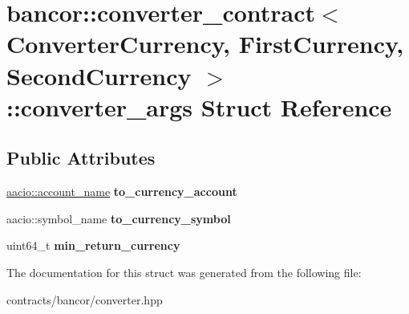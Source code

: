 \hypertarget{structbancor_1_1converter__contract_1_1converter__args}{}\section{bancor\+:\+:converter\+\_\+contract$<$ Converter\+Currency, First\+Currency, Second\+Currency $>$\+:\+:converter\+\_\+args Struct Reference}
\label{structbancor_1_1converter__contract_1_1converter__args}
\subsection*{Public Attributes}
\begin{DoxyCompactItemize}
\item 
\mbox{\label{structbancor_1_1converter__contract_1_1converter__args_af5d128b220162bf15a7a25f47c416dc4}} 
\mbox{\hyperlink{structaacio_1_1chain_1_1name}{aacio\+::account\+\_\+name}} {\bfseries to\+\_\+currency\+\_\+account}
\item 
\mbox{\label{structbancor_1_1converter__contract_1_1converter__args_ab481b8ea80734ba3cf0809bbb4e453f6}} 
aacio\+::symbol\+\_\+name {\bfseries to\+\_\+currency\+\_\+symbol}
\item 
\mbox{\label{structbancor_1_1converter__contract_1_1converter__args_a460bfeca8e9d060792d1ea394f2c091e}} 
uint64\+\_\+t {\bfseries min\+\_\+return\+\_\+currency}
\end{DoxyCompactItemize}


The documentation for this struct was generated from the following file\+:\begin{DoxyCompactItemize}
\item 
contracts/bancor/converter.\+hpp\end{DoxyCompactItemize}
